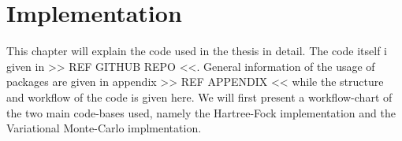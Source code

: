 \chapter{Implementation \label{chapter:6}}
    This chapter will explain the code used in the thesis in detail. The code
    itself i given in >> REF GITHUB REPO <<. General information of the usage
    of packages are given in appendix >> REF APPENDIX << while the structure
    and workflow of the code is given here. We will first present a
    workflow-chart of the two main code-bases used, namely the Hartree-Fock
    implementation and the Variational Monte-Carlo implmentation.
    \begin{figure}[H]
        \centering
        \begin{subfigure}[b!]{0.49\textwidth}
            \centering
        \end{subfigure}
    \end{figure}

